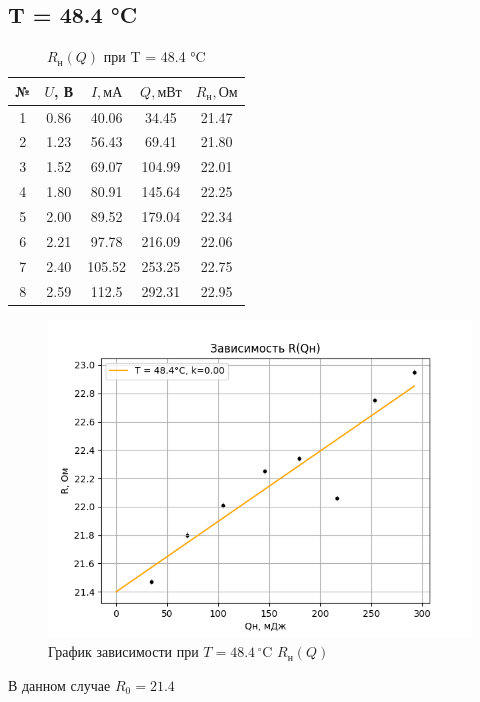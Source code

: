\documentclass[a4paper, 10pt, twocolumn]{article}
\begin{document}
    \subsection{T = 48.4 °C}
    \begin{table}[H]
        \centering
        \begin{tabular}{|c|c|c|c|c|} \hline
        № & $U$, В & $I, \text{мА}$ & $ Q, \text{мВт} $ & $R_\text{н}, \text{Ом}$ \\ \hline
        1 & 0.86 & 40.06  & 34.45  & 21.47 \\ \hline
        2 & 1.23 & 56.43  & 69.41  & 21.80 \\ \hline
        3 & 1.52 & 69.07  & 104.99 & 22.01 \\ \hline
        4 & 1.80 & 80.91  & 145.64 & 22.25 \\ \hline
        5 & 2.00 & 89.52  & 179.04 & 22.34 \\ \hline
        6 & 2.21 & 97.78  & 216.09 & 22.06 \\ \hline
        7 & 2.40 & 105.52 & 253.25 & 22.75 \\ \hline
        8 & 2.59 & 112.5  & 292.31 & 22.95 \\ \hline
        \end{tabular}
        \caption{$R_\text{н}(Q)$ при T = 48.4 °C}
    \end{table}

    \begin{figure}[H]
        \centering
        \includegraphics[width=1\linewidth]{graphs/figure3.png}
        \begin{center}
            \caption{График зависимости при $T =48.4 \, ^\circ\text{C}$ $R_\text{н}(Q)$}
        \end{center}
    \end{figure}
    В данном случае $R_0 = 21.4$
\end{document}
